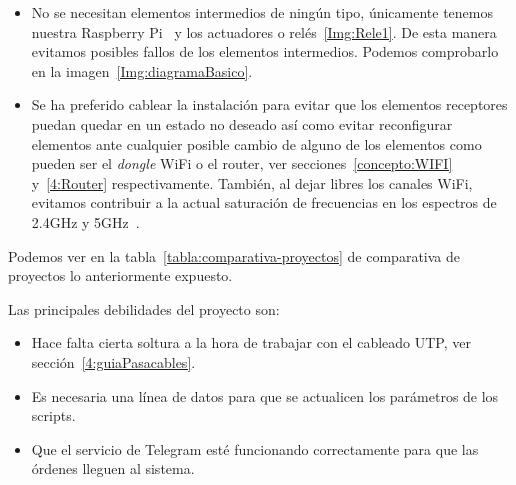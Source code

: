 \begin{itemize}
\item
    No se necesitan elementos intermedios de ningún tipo, únicamente tenemos nuestra Raspberry Pi~\cite{misc:RbPWeb} y los actuadores o relés~\ref{Img:Rele1}. De esta manera evitamos posibles fallos de los elementos intermedios. Podemos comprobarlo en la imagen~\ref{Img:diagramaBasico}.

    
\item
    Se ha preferido cablear la instalación para evitar que los elementos receptores puedan quedar en un estado no deseado así como evitar reconfigurar elementos ante cualquier posible cambio de alguno de los elementos como pueden ser el \textit{dongle} WiFi o el router, ver secciones~\ref{concepto:WIFI} y~\ref{4:Router} respectivamente.
    También, al dejar libres los canales WiFi, evitamos contribuir a la actual saturación de frecuencias en los espectros de 2.4GHz y 5GHz~\cite{manual:IEEE802.11}.

\end{itemize}


Podemos ver en la tabla~\ref{tabla:comparativa-proyectos} de comparativa de proyectos lo anteriormente expuesto.



Las principales debilidades del proyecto son:

\begin{itemize}
\tightlist
\item Hace falta cierta soltura a la hora de trabajar con el cableado UTP, ver sección~\ref{4:guiaPasacables}.
\item Es necesaria una línea de datos para que se actualicen los parámetros de los scripts.
\item Que el servicio de Telegram esté funcionando correctamente para que las órdenes lleguen al sistema.    

\end{itemize}
